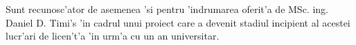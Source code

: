\documentclass[12pt,a4paper,twoside]{report}
\begin{document}
\vspace{5px}

Sunt recunosc'ator de asemenea 'si pentru 'indrumarea oferit'a de MSc. ing. Daniel D. Timi's 'in cadrul unui proiect care a devenit stadiul incipient al acestei lucr'ari de licen't'a 'in urm'a cu un an universitar. 


\pagestyle{headings}







\end{document}
